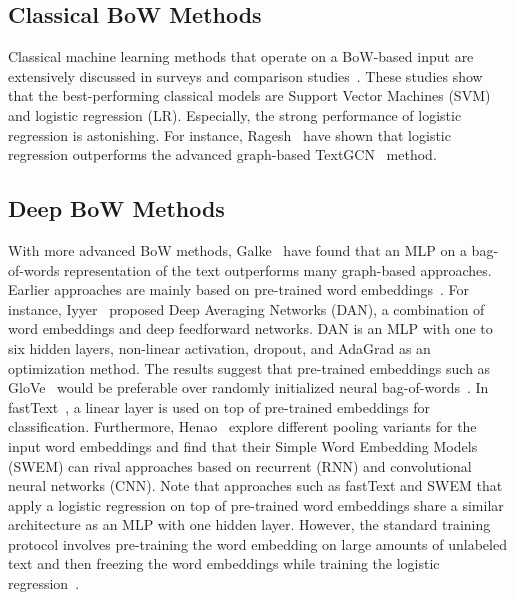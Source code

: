 \documentclass[acmsmall,nonacm]{acmart}
\begin{document}
\subsection{Classical BoW Methods}

Classical machine learning methods that operate on a BoW-based input are extensively discussed in surveys and comparison studies~\cite{
DBLP:conf/wsdm/RageshSIBL21,
DBLP:journals/information/KowsariMHMBB19,
DBLP:journals/air/Kadhim19,
DBLP:conf/kcap/GalkeMSBS17}.
These studies show that the best-performing classical models are Support Vector Machines (SVM) and logistic regression (LR).
Especially, the strong performance of logistic regression is astonishing.
For instance, Ragesh~\etal\cite{DBLP:conf/wsdm/RageshSIBL21} have shown that logistic regression outperforms the advanced graph-based TextGCN~\cite{DBLP:conf/aaai/YaoM019} method. 

\subsection{Deep BoW Methods}

With more advanced BoW methods, Galke~\etal\cite{DBLP:conf/kcap/GalkeMSBS17} have found that an MLP on a bag-of-words representation of the text outperforms many graph-based approaches.
Earlier approaches are mainly based on pre-trained word embeddings~\cite{DBLP:conf/nips/MikolovSCCD13,DBLP:conf/emnlp/PenningtonSM14}.
For instance, Iyyer~\etal\cite{DBLP:conf/acl/IyyerMBD15} proposed Deep Averaging Networks (DAN), a combination of word embeddings and deep feedforward networks.
DAN is an MLP with one to six hidden layers, non-linear activation, dropout, and AdaGrad as an optimization method.
The results suggest that pre-trained embeddings such as GloVe~\cite{DBLP:conf/emnlp/PenningtonSM14} would be preferable over randomly initialized neural bag-of-words~\cite{DBLP:conf/acl/KalchbrennerGB14}.
In fastText~\cite{DBLP:journals/tacl/BojanowskiGJM17,DBLP:conf/eacl/GraveMJB17}, a linear layer is used on top of pre-trained embeddings for classification.
Furthermore, Henao~\etal\cite{DBLP:conf/acl/HenaoLCSSWWMZ18} explore different pooling variants for the input word embeddings and find that their Simple Word Embedding Models (SWEM) can rival approaches based on recurrent (RNN) and convolutional neural networks (CNN).
Note that approaches such as fastText and SWEM that apply a logistic regression on top of pre-trained word embeddings share a similar architecture as an MLP with one hidden layer. 
However, the standard training protocol involves pre-training the word embedding on large amounts of unlabeled text and then freezing the word embeddings while training the logistic regression~\cite{DBLP:conf/nips/MikolovSCCD13}.
\end{document}
